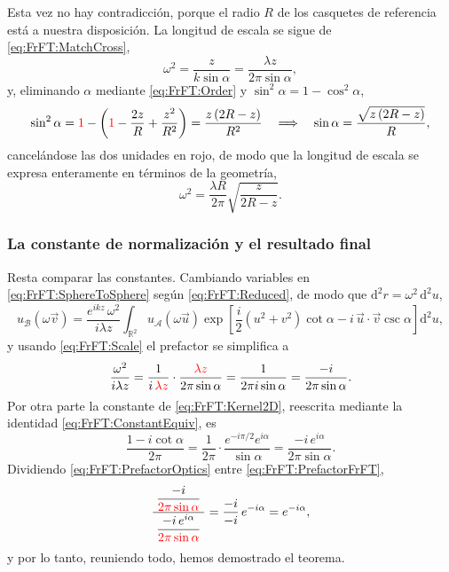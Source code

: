 			Esta vez no hay contradicción, porque el radio $R$ de los casquetes de referencia está a nuestra disposición. La longitud de escala se sigue de \eqref{eq:FrFT:MatchCross},
			\begin{equation}\label{eq:FrFT:Scale}
				\omega^{2} = \frac{z}{k\sin\alpha} = \frac{\lambda z}{2\pi\sin\alpha},
			\end{equation}
			y, eliminando $\alpha$ mediante \eqref{eq:FrFT:Order} y $\sin^{2}\alpha = 1-\cos^{2}\alpha$,
			\begin{equation*}
				\sin^{2}\alpha = {\color{red}1} - \left({\color{red}1} - \frac{2z}{R} + \frac{z^{2}}{R^{2}}\right) = \frac{z\left(2R-z\right)}{R^{2}} \quad\Longrightarrow\quad \sin\alpha = \frac{\sqrt{z\left(2R-z\right)}}{R},
			\end{equation*}
			cancelándose las dos unidades en rojo, de modo que la longitud de escala se expresa enteramente en términos de la geometría,
			\begin{equation}\label{eq:FrFT:ScaleExplicit}
				\omega^{2} = \frac{\lambda R}{2\pi}\sqrt{\frac{z}{2R-z}}.
			\end{equation}

		\subsubsection{La constante de normalización y el resultado final}

			Resta comparar las constantes. Cambiando variables en \eqref{eq:FrFT:SphereToSphere} según \eqref{eq:FrFT:Reduced}, de modo que $\mathrm{d}^{2}r = \omega^{2}\,\mathrm{d}^{2}u$,
			\begin{equation}\label{eq:FrFT:Reduced2}
				u_{\mathcal{B}}(\omega\vec{v}) = \frac{e^{ikz}\,\omega^{2}}{i\lambda z}\int_{\mathbb{R}^{2}} u_{\mathcal{A}}(\omega\vec{u})\exp\left[\frac{i}{2}\left(u^{2}+v^{2}\right)\cot\alpha - i\,\vec{u}\cdot\vec{v}\csc\alpha\right]\mathrm{d}^{2}u,
			\end{equation}
			y usando \eqref{eq:FrFT:Scale} el prefactor se simplifica a
			\begin{equation}\label{eq:FrFT:PrefactorOptics}
				\frac{\omega^{2}}{i\lambda z} = \frac{1}{i\,{\color{red}\lambda z}}\cdot\frac{{\color{red}\lambda z}}{2\pi\sin\alpha} = \frac{1}{2\pi i\sin\alpha} = \frac{-i}{2\pi\sin\alpha}.
			\end{equation}
			Por otra parte la constante de \eqref{eq:FrFT:Kernel2D}, reescrita mediante la identidad \eqref{eq:FrFT:ConstantEquiv}, es
			\begin{equation}\label{eq:FrFT:PrefactorFrFT}
				\frac{1-i\cot\alpha}{2\pi} = \frac{1}{2\pi}\cdot\frac{e^{-i\pi/2}e^{i\alpha}}{\sin\alpha} = \frac{-i\,e^{i\alpha}}{2\pi\sin\alpha}.
			\end{equation}
			Dividiendo \eqref{eq:FrFT:PrefactorOptics} entre \eqref{eq:FrFT:PrefactorFrFT},
			\begin{equation*}
				\frac{\;\dfrac{-i}{{\color{red}2\pi\sin\alpha}}\;}{\dfrac{-i\,e^{i\alpha}}{{\color{red}2\pi\sin\alpha}}} = \frac{-i}{-i}\,e^{-i\alpha} = e^{-i\alpha},
			\end{equation*}
			y por lo tanto, reuniendo todo, hemos demostrado el teorema.

